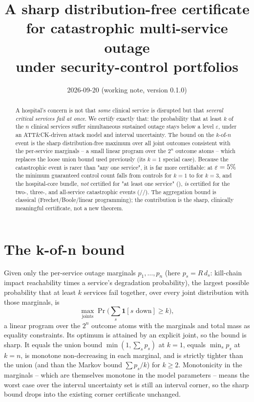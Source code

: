 \documentclass[11pt]{article}
\title{A sharp distribution-free certificate for catastrophic multi-service outage\\
under security-control portfolios}
\author{}
\date{2026-09-20 (working note, version 0.1.0)}
\begin{document}
\maketitle

\begin{abstract}
A hospital's concern is not that \emph{some} clinical service is disrupted but that
\emph{several critical services fail at once}. We certify exactly that: the
probability that at least $k$ of the $n$ clinical services suffer simultaneous
sustained outage stays below a level $\varepsilon$, under an ATT\&CK-driven attack
model and interval uncertainty. The bound on the $k$-of-$n$ event is the sharp
distribution-free maximum over all joint outcomes consistent with the per-service
marginals -- a small linear program over the $2^n$ outcome atoms -- which replaces
the loose union bound used previously (its $k{=}1$ special case). Because the
catastrophic event is rarer than "any one service", it is far more certifiable: at
$\varepsilon=5\%$ the minimum guaranteed control count falls from
\CatMinGuardKOne{} controls for $k{=}1$ to \CatMinGuardKThree{} for $k{=}3$, and the
hospital-core bundle, \emph{not} certified for "at least one service"
(\CatCoreKOneGuar), \emph{is} certified for the two-, three-, and all-service
catastrophic events (\CatCoreKTwoGuar/\CatCoreKThreeGuar/\CatCoreKFourGuar). The aggregation
bound is classical (Frechet/Boole/linear programming); the contribution is the
sharp, clinically meaningful certificate, not a new theorem.
\end{abstract}

\section{The k-of-n bound}
Given only the per-service outage marginals $p_1,\dots,p_n$ (here
$p_s = R\,d_s$: kill-chain impact reachability times a service's degradation
probability), the largest possible probability that at least $k$ services fail
together, over every joint distribution with those marginals, is
\[
\max_{\text{joints}} \Pr\!\Big(\textstyle\sum_s \mathbf 1[s\text{ down}] \ge k\Big),
\]
a linear program over the $2^n$ outcome atoms with the marginals and total mass as
equality constraints. Its optimum is attained by an explicit joint, so the bound is
sharp. It equals the union bound $\min(1,\sum_s p_s)$ at $k=1$, equals $\min_s p_s$
at $k=n$, is monotone non-decreasing in each marginal, and is strictly tighter than
the union (and than the Markov bound $\sum p_s/k$) for $k\ge 2$. Monotonicity in the
marginals -- which are themselves monotone in the model parameters -- means the
worst case over the interval uncertainty set is still an interval corner, so the
sharp bound drops into the existing corner certificate unchanged.
\end{document}
